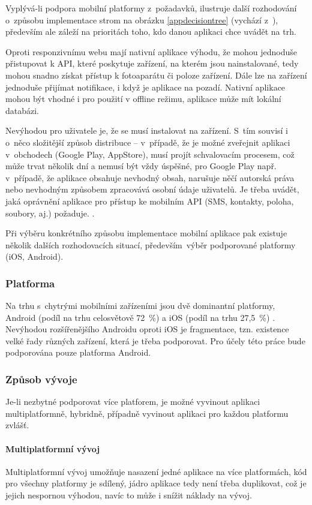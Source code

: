 \documentclass[twoside]{ctuthesis}
\begin{document}
Vyplývá-li podpora mobilní platformy z~požadavků, ilustruje další rozhodování o~způsobu implementace strom na obrázku \ref{appdecisiontree} (vychází z~\cite{matyunina2020native}), především ale záleží na prioritách toho, kdo danou aplikaci chce uvádět na trh.

Oproti responzivnímu webu mají nativní aplikace výhodu, že mohou jednoduše přistupovat k API, které poskytuje zařízení, na kterém jsou nainstalované, tedy mohou snadno získat přístup k fotoaparátu či poloze zařízení. Dále lze na zařízení jednoduše přijímat notifikace, i když je aplikace na pozadí. Nativní aplikace mohou být vhodné i pro použití v offline režimu, aplikace může mít lokální databázi.

Nevýhodou pro uživatele je, že se musí instalovat na zařízení. S~tím souvisí i o~něco složitější způsob distribuce -- v~případě, že je možné zveřejnit aplikaci v~obchodech (Google Play, AppStore), musí projít schvalovacím procesem, což může trvat několik dní a nemusí být vždy úspěšné, pro Google Play např. v~případě, že aplikace obsahuje nevhodný obsah, narušuje něčí autorská práva nebo nevhodným způsobem zpracovává osobní údaje uživatelů. Je třeba uvádět, jaká oprávnění aplikace pro přístup ke mobilním API (SMS, kontakty, poloha, soubory, aj.) požaduje. \cite{google2021policy}.

Při výběru konkrétního způsobu implementace mobilní aplikace pak existuje několik dalších rozhodovacích situací, především~výběr podporované platformy (iOS, Android).

\subsubsection{Platforma}
Na trhu s~chytrými mobilními zařízeními jsou dvě dominantní platformy, Android (podíl na trhu celosvětově 72~\%) a iOS (podíl na trhu 27,5~\%) \cite{statcounter2021mobile}. Nevýhodou rozšířenějšího Androidu oproti iOS je fragmentace, tzn. existence velké řady různých zařízení, která je třeba podporovat. Pro účely této práce bude podporována pouze platforma Android.


\subsubsection{Způsob vývoje}

Je-li nezbytné podporovat více platforem, je možné vyvinout aplikaci multiplatformně, hybridně, případně vyvinout aplikaci pro každou platformu zvlášť.

\paragraph{Multiplatformní vývoj}
Multiplatformní vývoj umožňuje nasazení jedné aplikace na více platformách, kód pro všechny platformy je sdílený, jádro aplikace tedy není třeba duplikovat, což je jejich nespornou výhodou, navíc to může i snížit náklady na vývoj.
\end{document}
